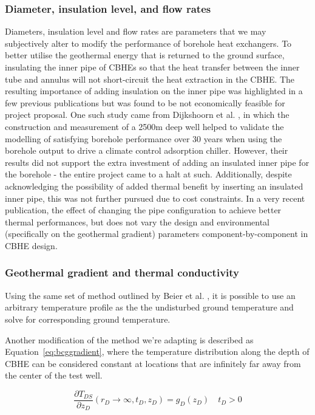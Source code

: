 	\subsubsection{Diameter, insulation level, and flow rates}
	Diameters, insulation level and flow rates are parameters that we may subjectively alter to modify the performance of borehole heat exchangers. 
	To better utilise the geothermal energy that is returned to the ground surface, insulating the inner pipe of CBHEs so that the heat transfer between the inner tube and annulus will not short-circuit the heat extraction in the CBHE.  
	The resulting importance of adding insulation on the inner pipe was highlighted in a few previous publications \cite{li_synthesis_2014,guillaume_analysis_2011}but was found to be not economically feasible for project proposal\cite{dijkshoorn_measurements_2013}. 
	One such study came from Dijkshoorn et al. , in which the construction and measurement of a 2500m deep well helped to validate the modelling of satisfying borehole performance over 30 years when using the borehole output to drive a climate control adsorption chiller. However, their results did not support the extra investment of adding an insulated inner pipe for the borehole - the entire project came to a halt at such.
	Additionally, despite acknowledging the possibility of added thermal benefit by inserting an insulated inner pipe, this was not further pursued due to cost constraints. In a very recent publication, the effect of changing the pipe configuration to achieve better thermal performances, but does not vary the design and environmental (specifically on the geothermal gradient) parameters component-by-component in CBHE design\cite{liu_numerical_2019}.

	
	\subsubsection{Geothermal gradient and thermal conductivity}
	Using the same set of method outlined by Beier et al. \cite{beier_situ_2012}, it is possible to use an arbitrary temperature profile as the the undisturbed ground temperature and solve for corresponding ground temperature. 
	
	Another modification of the method we're adapting is described as Equation~\ref{eq:bcggradient}, where the temperature distribution along the depth of CBHE can be considered constant at locations that are infinitely far away from the center of the test well.  
	
	\begin{equation}
            \frac{\partial T_{DS}}{\partial z_D}(r_D\rightarrow \infty, t_D,z_D) = g_D(z_D) \quad t_D > 0\label{eq:bcggradient}
    \end{equation}
	
